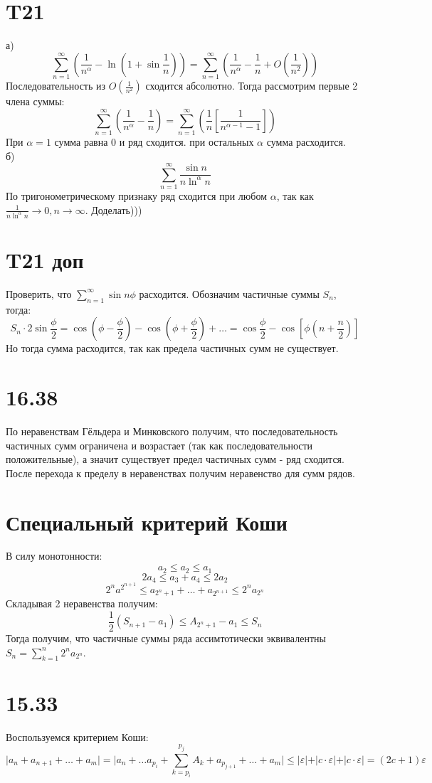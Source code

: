 \documentclass[12pt]{article}
\begin{document}
\section{T21}
а)
\[
    \sum_{n=1}^{\infty} \left( \frac{1}{n^\alpha } - \ln (1 + \sin \frac{1}{n}) \right) = \sum_{n=1}^{\infty} \left( \frac{1}{n^\alpha} - \frac{1}{n} + O(\frac{1}{n^{2}}) \right) 
\]
Последовательность из $O(\frac{1}{n^2})$ сходится абсолютно. Тогда рассмотрим первые 2 члена суммы:
\[
    \sum_{n=1}^{\infty} \left( \frac{1}{n^\alpha } - \frac{1}{n} \right) = 
    \sum_{n=1}^{\infty} \left( \frac{1}{n} \left[\frac{1}{n^{\alpha-1} - 1}\right] \right) 
\] 
При $\alpha = 1$ сумма равна $0$ и ряд сходится.
при остальных $\alpha $ сумма расходится.
\\
б)
\[
    \sum_{n=1}^{\infty} \frac{\sin n}{n \ln^\alpha n}
\]
По тригонометрическому признаку ряд сходится при любом $\alpha$, так как $\frac{1}{n \ln ^\alpha n} \to 0, n \to \infty $. 
Доделать)))
\section{T21 доп}
Проверить, что $\sum_{n=1}^{\infty} \sin n\phi$ расходится.
Обозначим частичные суммы $S_n$, тогда: 
\[
    S_n \cdot 2\sin \frac{\phi}{2} = \cos \left( \phi - \frac{\phi}{2} \right)  
    - \cos \left( \phi + \frac{\phi}{2} \right) + \dots = \cos \frac{\phi}{2} - \cos \left[ \phi \left( n + \frac{n}{2} \right) \right] 
\]  
Но тогда сумма расходится, так как предела частичных сумм не существует.
\section{16.38}
По неравенствам Гёльдера и Минковского получим, что последовательность частичных сумм ограничена и возрастает (так как 
последовательности положительные), а значит существует предел частичных сумм - ряд сходится. После перехода к пределу в неравенствах получим неравенство для сумм рядов.
\section{Специальный критерий Коши}
В силу монотонности: 
\[
    a_2 \leq a_2 \leq a_1
\]
\[
    2a_4 \leq a_3 + a_4 \leq 2a_2
\]
\[
    2^n a^{2^{n+1} } \leq a_{2^n+1 } + \dots + a_{2^{n+1} } \leq 2^n a_{2^n}
\]
Складывая 2 неравенства получим:
\[
    \frac{1}{2}(S_{n+1} - a_1 ) \leq A_{2^n + 1} - a_1 \leq S_n
\]
Тогда получим, что частичные суммы ряда ассимтотически эквивалентны $S_n = \sum_{k=1}^{n} 2^n a_{2^n}$. 
\section{15.33}
Воспользуемся критерием Коши:
\[
    \vert a_n + a_{n+1} + \dots + a_{m} \vert = 
    \vert a_n + \dots a_{p_i} + \sum_{k=p_i}^{p_j} A_k + a_{p_{j+1} } + \dots +  a_m \vert \leq 
    \vert \varepsilon  \vert + \vert c \cdot \varepsilon \vert + \vert c \cdot \varepsilon \vert = 
    (2c + 1) \varepsilon 
\]
\end{document}

